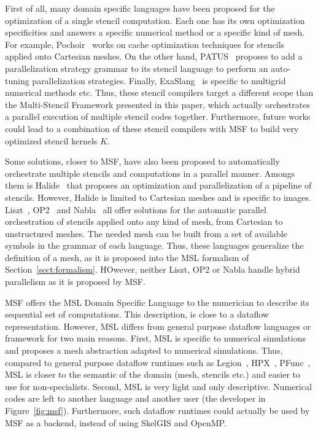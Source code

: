 First of all, many domain specific languages have been proposed for the optimization of a single stencil computation. Each one has its own optimization specificities and answers a specific numerical method or a specific kind of mesh. For example, Pochoir~\cite{spaaTangCKLL11} works on cache optimization techniques for stencils applied onto Cartesian meshes. On the other hand, PATUS~\cite{citeulike12258902} proposes to add a parallelization strategy grammar to its stencil language to perform an auto-tuning parallelization strategies. Finally, ExaSlang~\cite{Schmitt:2014:EDL:2691166.2691171} is specific to multigrid numerical methods etc. Thus, these stencil compilers target a different scope than the Multi-Stencil Framework presented in this paper, which actually orchestrates a parallel execution of multiple stencil codes together. Furthermore, future works could lead to a combination of these stencil compilers with MSF to build very optimized stencil kernels $K$.

Some solutions, closer to MSF, have also been proposed to automatically orchestrate multiple stencils and computations in a parallel manner. Amongs them is Halide~\cite{Ragan-Kelley:2013:HLC:2491956.2462176} that proposes an optimization and parallelization of a pipeline of stencils. However, Halide is limited to Cartesian meshes and is specific to images. Liszt~\cite{DeVito:2011:LDS:2063384.2063396}, OP2~\cite{} and Nabla~\cite{Camier:2015:IPP:2820083.2820107} all offer solutions for the automatic parallel orchestration of stencils applied onto any kind of mesh, from Cartesian to unstructured meshes. The needed mesh can be built from a set of available symbols in the grammar of each language. Thus, these languages generalize the definition of a mesh, as it is proposed into the MSL formalism of Section~\ref{sect:formalism}. HOwever, neither Liszt, OP2 or Nabla handle hybrid parallelism as it is proposed by MSF.

MSF offers the MSL Domain Specific Language to the numerician to describe its sequential set of computations. This description, is close to a dataflow representation. However, MSL differs from general purpose dataflow languages or framework for two main reasons. First, MSL is specific to numerical simulations and proposes a mesh abstraction adapted to numerical simulations. Thus, compared to general purpose dataflow runtimes such as Legion~\cite{bauer:legion:sc:2012}, HPX~\cite{}, PFunc~\cite{}, MSL is closer to the semantic of the domain (mesh, stencils etc.) and easier to use for non-specialists. Second, MSL is very light and only descriptive. Numerical codes are left to another language and another user (the developer in Figure~\ref{fig:msf}). Furthermore, such dataflow runtimes could actually be used by MSF as a backend, instead of using SkelGIS and OpenMP.

